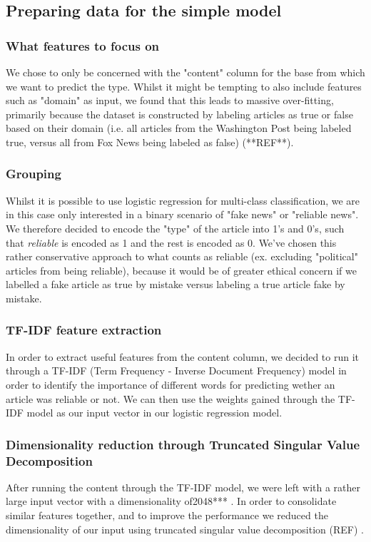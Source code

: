 \documentclass{article}
\begin{document}
\subsection{Preparing data for the simple model}
\subsubsection{What features to focus on}
We chose to only be concerned with the "content" column for the base from which we want to predict the type. Whilst it
might be tempting to also include features such as "domain" as input, we found that this leads to massive over-fitting,
primarily because the dataset is constructed by labeling articles as true or false based on their domain (i.e. all
articles from the Washington Post being labeled true, versus all from Fox News being labeled as false) (**REF**).
\subsubsection{Grouping}
Whilst it is possible to use logistic regression for multi-class classification, we are in this case only interested in
a binary scenario of "fake news" or "reliable news". We therefore decided to encode the "type" of the article into 1's
and 0's, such that \textit{reliable} is encoded as 1 and the rest is encoded as 0. We've chosen this rather
conservative approach to what counts as reliable (ex. excluding "political" articles from being reliable), because it
would be of greater ethical concern if we labelled a fake article as true by mistake versus labeling a true article
fake by mistake.

\subsubsection{TF-IDF feature extraction}
In order to extract useful features from the content column, we decided to run it through a TF-IDF (Term
Frequency - Inverse Document Frequency) model in order to identify the importance of different words for predicting
wether an article was reliable or not. We can then use the weights gained through the TF-IDF model as our input vector
in our logistic regression model. 

\subsubsection{Dimensionality reduction through Truncated Singular Value Decomposition}
After running the content through the TF-IDF model, we were left with a rather large input vector with a dimensionality
of2048***
. In order to consolidate similar features together, and to improve the performance we reduced the
dimensionality of our input using truncated singular value decomposition (REF) .
\end{document}
